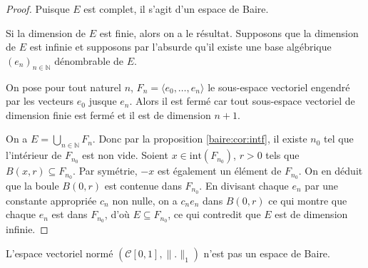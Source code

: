 \begin{proof}
  Puisque $E$ est complet, il s'agit d'un espace de Baire.

  Si la dimension de $E$ est finie, alors on a le résultat.
  Supposons que la dimension de $E$ est infinie et supposons
  par l'absurde qu'il existe une base algébrique $(e_n)_{n\in\mathbb N}$
  dénombrable de $E$.

  On pose pour tout naturel $n$, $F_n = \langle e_0, \ldots, e_n\rangle$ le
  sous-espace vectoriel engendré par les vecteurs $e_0$ jusque $e_n$.
  Alors il est fermé car tout sous-espace vectoriel de dimension finie
  est fermé et il est de dimension $n+1$.

  On a $E = \bigcup_{n\in\mathbb N} F_n$. Donc par la proposition
  \ref{baire:cor:intf}, il existe $n_0$ tel que l'intérieur de
  $F_{n_0}$ est non vide. Soient $x\in \mathrm{int}(F_{n_0})$, $r > 0$
  tels que $B(x, r)\subseteq F_{n_0}$. Par symétrie, $-x$
  est également un élément de $F_{n_0}$. On en déduit que la boule
  $B(0, r)$ est contenue dans $F_{n_0}$. En divisant chaque $e_n$
  par une constante appropriée $c_n$ non nulle, on a $c_n e_n$
  dans $B(0, r)$ ce qui montre que chaque $e_n$ est dans $F_{n_0}$,
  d'où $E \subseteq F_{n_0}$, ce qui contredit que $E$ est de dimension infinie.
\end{proof}

\begin{prop}
  L'espace vectoriel normé $(\mathscr{C}[0, 1], \|.\|_1)$ n'est pas un
  espace de Baire.
\end{prop}

